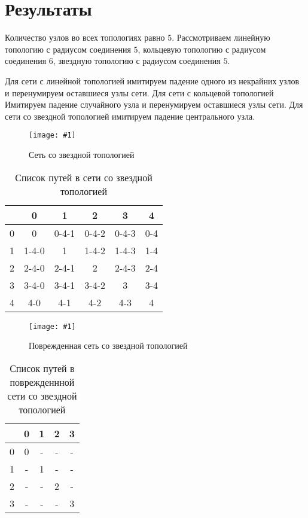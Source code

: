 \documentclass[a4paper,12pt]{article}
\newcommand{\plot}[3]{
  \begin{figure}[H]
    \begin{center}
      \texttt{[image: \#1]}
      \caption{#2}
      \label{#3}
    \end{center}
  \end{figure}
}
\begin{document}
\section{Результаты}
\quad Количество узлов во всех топологиях равно $5$. Рассмотриваем линейную
топологию с радиусом соединения $5$, кольцевую топологию с радиусом соединения
$6$, звездную топологию с радиусом соединения $5$.

Для сети с линейной топологией имитируем падение одного из некрайних узлов и
перенумируем оставшиеся узлы сети. Для сети с кольцевой топологией Имитируем
падение случайного узла и перенумируем оставшиеся узлы сети. Для сети со
звездной топологией имитируем падение центрального узла.

\plot{./images/TopologyStar.png}{Сеть со звездной топологией}{p:sl}

\begin{table}[H]
  \caption{Список путей в сети со звездной топологией}
  \begin{tabular}{| c | c | c | c | c | c |}
    \hline
             & 0 & 1 & 2 & 3 & 4 \\
             \hline
    0 & 0 & 0-4-1 & 0-4-2 & 0-4-3 & 0-4 \\
    \hline
    1 & 1-4-0 & 1 & 1-4-2 & 1-4-3 & 1-4 \\
    \hline
    2 & 2-4-0 & 2-4-1 & 2 & 2-4-3 & 2-4 \\
    \hline
    3 & 3-4-0 & 3-4-1 & 3-4-2 & 3 & 3-4 \\
    \hline
    4 & 4-0 & 4-1 & 4-2 & 4-3 & 4 \\
    \hline
  \end{tabular}
  \centering
\end{table}

\plot{./images/TopologyStar_corrupted.png}{Поврежденная сеть со звездной
топологией}{p:sl_c}

\begin{table}[H]
  \caption{Список путей в поврежденнной сети со звездной топологией}
  \begin{tabular}{| c | c | c | c | c |}
    \hline
             & 0 & 1 & 2 & 3 \\
             \hline
    0 & 0 & - & - & - \\
    \hline
    1 & - & 1 & - & - \\
    \hline
    2 & - & - & 2 & - \\
    \hline
    3 & - & - & - & 3 \\
    \hline
  \end{tabular}
  \centering
\end{table}
\end{document}
